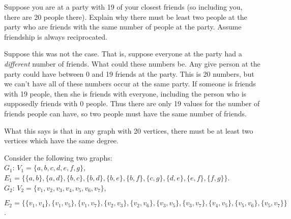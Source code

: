 \documentclass[10pt]{exam}
\begin{document}
\begin{questions}
  \question[6] Suppose you are at a party with 19 of your closest friends (so including you, there are 20 people there).  Explain why there must be least two people at the party who are friends with the same number of people at the party.  Assume friendship is always reciprocated.

  \begin{solution}
    Suppose this was not the case.  That is, suppose everyone at the party had a {\em different} number of friends.  What could these numbers be.  Any give person at the party could have between 0 and 19 friends at the party.  This is 20 numbers, but we can't have all of these numbers occur at the same party.  If someone is friends with 19 people, then she is friends with everyone, including the person who is supposedly friends with 0 people.  Thus there are only 19 values for the number of friends people can have, so two people must have the same number of friends.

    What this says is that in any graph with 20 vertices, there must be at least two vertices which have the same degree.
  \end{solution}


  \question[6] Consider the following two graphs:\\
  $G_1$: $V_1=\{a,b,c,d,e,f,g\}$, $E_1=\{\{a,b\},\{a,d\},\{b,c\},\{b,d\},\{b,e\},\{b,f\},\{c,g\},\{d,e\},\{e,f\},\{f,g\}\}$.\\
  $G_2$: $V_2=\{v_1,v_2,v_3,v_4,v_5,v_6,v_7\}$,

  \hspace{1.75em} $E_2=\{\{v_1,v_4\},\{v_1,v_5\},\{v_1,v_7\},\{v_2,v_3\},\{v_2,v_6\},\{v_3,v_5\},\{v_3,v_7\},\{v_4,v_5\},\{v_5,v_6\},\{v_5,v_7\}\}$.
\end{questions}
\end{document}
